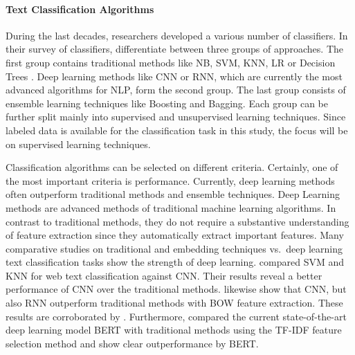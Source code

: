 \documentclass[12pt, a4paper, titlepage]{article}
\begin{document}
\paragraph{Text Classification Algorithms}
During the last decades, researchers developed a various number of classifiers. In their survey of classifiers, \cite{kowsari2019text} differentiate between three groups of approaches. The first group contains traditional methods like \ac{NB}, \ac{SVM}, \ac{KNN}, \ac{LR} or Decision Trees \citep{Vijayan2017, Colas2006, kowsari2019text, Sebastiani2001}. Deep learning methods like \ac{CNN} or \ac{RNN}, which are currently the most advanced algorithms for \ac{NLP}, form the second group. The last group consists of ensemble learning techniques like Boosting and Bagging. Each group can be further split mainly into supervised and unsupervised learning techniques. Since labeled data is available for the classification task in this study, the focus will be on supervised learning techniques. 

Classification algorithms can be selected on different criteria. Certainly, one of the most important criteria is performance. Currently, deep learning methods often outperform traditional methods and ensemble techniques. Deep Learning methods are advanced methods of traditional machine learning algorithms. In contrast to traditional methods, they do not require a substantive understanding of feature extraction since they automatically extract important features. Many comparative studies on traditional and embedding techniques vs.\ deep learning text classification tasks show the strength of deep learning. \citet{wang2017} compared \ac{SVM} and \ac{KNN} for web text classification against \ac{CNN}. Their results reveal a better performance of \ac{CNN} over the traditional methods. \citet{hassan2017} likewise show that \ac{CNN}, but also \ac{RNN} outperform traditional methods with \ac{BOW} feature extraction. These results are corroborated by \citet{kamath2018}. Furthermore, \citet{gonzalez2020} compared the current state-of-the-art deep learning model \ac{BERT} with traditional methods using the \ac{TF-IDF} feature selection method and show clear outperformance by \ac{BERT}. 
\end{document}
